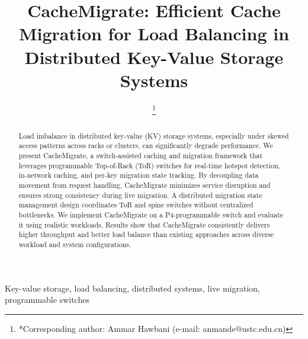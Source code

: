 \documentclass[conference]{IEEEtran}
\begin{document}
\title{CacheMigrate: Efficient Cache Migration for Load Balancing in Distributed Key-Value Storage Systems}

\author{
    \thanks{*Corresponding author: Ammar Hawbani (e-mail: anmande@ustc.edu.cn)}
}

\maketitle

\begin{abstract}
    Load imbalance in distributed key-value (KV) storage systems, especially under skewed access patterns across racks or clusters, can significantly degrade performance. We present CacheMigrate, a switch-assisted caching and migration framework that leverages programmable Top-of-Rack (ToR) switches for real-time hotspot detection, in-network caching, and per-key migration state tracking. By decoupling data movement from request handling, CacheMigrate minimizes service disruption and ensures strong consistency during live migration. A distributed migration state management design coordinates ToR and spine switches without centralized bottlenecks. We implement CacheMigrate on a P4-programmable switch and evaluate it using realistic workloads. Results show that CacheMigrate consistently delivers higher throughput and better load balance than existing approaches across diverse workload and system configurations.
\end{abstract}

\begin{IEEEkeywords}
    Key-value storage, load balancing, distributed systems, live migration, programmable switches
\end{IEEEkeywords}
\end{document}
